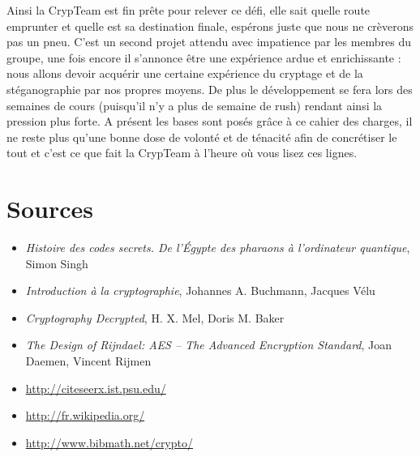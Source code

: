 \documentclass[a4paper,12pt]{article}
\begin{document}
Ainsi la CrypTeam est fin prête pour relever ce défi, elle sait quelle route emprunter et quelle est sa destination finale, espérons juste que nous ne crèverons pas un pneu. C'est un second projet attendu avec impatience par les membres du groupe, une fois encore il s'annonce être une expérience ardue et enrichissante : nous allons devoir acquérir une certaine expérience du cryptage et de la stéganographie par nos propres moyens. De plus le développement se fera lors des semaines de cours (puisqu'il n'y a plus de semaine de rush) rendant ainsi la pression plus forte. A présent les bases sont posés grâce à ce cahier des charges, il ne reste plus qu'une bonne dose de volonté et de ténacité afin de concrétiser le tout et c'est ce que fait la CrypTeam à l'heure où vous lisez ces lignes.

\newpage

\part*{Sources}

\begin{itemize}
\item \emph{Histoire des codes secrets. De l'Égypte des pharaons à l'ordinateur quantique}, Simon Singh
\item \emph{Introduction à la cryptographie}, Johannes A. Buchmann, Jacques Vélu
\item \emph{Cryptography Decrypted}, H. X. Mel, Doris M. Baker
\item \emph{The Design of Rijndael: AES -- The Advanced Encryption Standard}, Joan Daemen, Vincent Rijmen
\item \href{http://citeseerx.ist.psu.edu/}{http://citeseerx.ist.psu.edu/}
\item \href{http://fr.wikipedia.org/}{http://fr.wikipedia.org/}
\item \href{http://www.bibmath.net/crypto/}{http://www.bibmath.net/crypto/}
\end{itemize}
\end{document}
